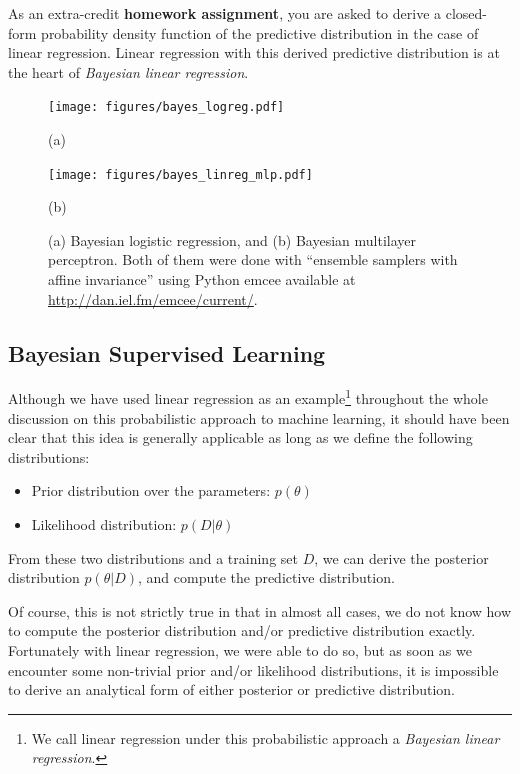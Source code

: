 \documentclass{report}
\begin{document}
As an extra-credit {\bf homework assignment}, you are asked to derive a
closed-form probability density function of the predictive distribution in the
case of linear regression. Linear regression with this derived predictive
distribution is at the heart of {\it Bayesian linear regression}.


\begin{figure}[t]
    \centering
    \begin{minipage}{0.48\textwidth}
        \centering
        \texttt{[image: figures/bayes\_logreg.pdf]}

        (a)
    \end{minipage}
    \hfill
    \begin{minipage}{0.48\textwidth}
        \centering
        \texttt{[image: figures/bayes\_linreg\_mlp.pdf]}

        (b)
    \end{minipage}

    \caption{
        \label{fig:bayes_logreg}
        (a) Bayesian logistic regression, and (b) Bayesian multilayer
        perceptron. Both of them were done with ``ensemble samplers with affine
        invariance'' \cite{goodman2010ensemble} using Python emcee available at
        \url{http://dan.iel.fm/emcee/current/}. 
    }
\end{figure}


\subsection{Bayesian Supervised Learning}

Although we have used linear regression as an example\footnote{
    We call linear regression under this probabilistic approach a {\it Bayesian
    linear regression}.
}
throughout the whole discussion on this probabilistic approach to machine
learning, it should have been clear that this idea is generally applicable as
long as we define the following distributions:
\begin{itemize}
    \item Prior distribution over the parameters: $p(\theta)$
    \item Likelihood distribution: $p(D|\theta)$
\end{itemize}
From these two distributions and a training set $D$, we can derive the posterior
distribution $p(\theta | D)$, and compute the predictive distribution. 

Of course, this is not strictly true in that in almost all cases, we do not know
how to compute the posterior distribution and/or predictive distribution
exactly. Fortunately with linear regression, we were able to do so, but as soon
as we encounter some non-trivial prior and/or likelihood distributions, it is
impossible to derive an analytical form of either posterior or predictive
distribution. 
\end{document}
